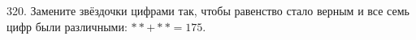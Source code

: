 320. Замените звёздочки цифрами так, чтобы равенство стало верным и все семь цифр были различными: $**+**=175.$\\
